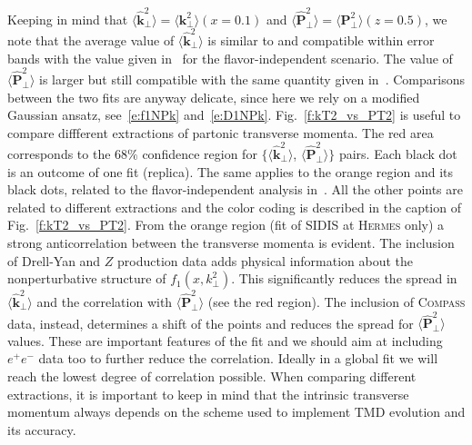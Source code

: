 \documentclass[aps,preprintnumbers,showpacs,nofootinbib,superscriptaddress,floatfix]{revtex4}
\newcommand{\hermes}{\textsc{Hermes }}
\newcommand{\compass}{\textsc{Compass }}
\newcommand{\T}{\perp}
\begin{document}
Keeping in mind that $\big \langle \hat{\bm{k}}_{\T}^2 \big \rangle = \big \langle \bm{k}_{\T}^2 \big \rangle (x=0.1)$ and  $\big \langle \hat{\bm{P}}_{\perp}^2 \big \rangle = \big \langle \bm{P}_{\perp}^2 \big \rangle (z=0.5)$, we note that the average value of $\big \langle \hat{\bm{k}}_{\T}^2 \big \rangle$ is similar to and compatible within error bands with the value given in~\cite{Signori:2013mda} for the flavor-independent scenario. The value of $\big \langle \hat{\bm{P}}_{\perp}^2 \big \rangle$ is larger but still compatible with the same quantity given in~\cite{Signori:2013mda}. Comparisons between the two fits are anyway delicate, since here we rely on a modified Gaussian ansatz, see~\eqref{e:f1NPk} and~\eqref{e:D1NPk}.
Fig.~\ref{f:kT2_vs_PT2} is useful to compare diffferent extractions of partonic transverse momenta. The red area corresponds to the $68\%$ confidence region for $\{ \big \langle \hat{\bm{k}}_{\T}^2 \big \rangle$, $\big \langle \hat{\bm{P}}_{\perp}^2 \big \rangle \}$ pairs. Each black dot is an outcome of one fit (replica). The same applies to the orange region and its black dots, related to the flavor-independent analysis in~\cite{Signori:2013mda}. All the other points are related to different extractions and the color coding is described in the caption of Fig.~\ref{f:kT2_vs_PT2}. 
From the orange region (fit of SIDIS at \hermes only) a strong anticorrelation between the transverse momenta is evident. 
The inclusion of Drell-Yan and $Z$ production data adds physical information about the nonperturbative structure of  $f_1(x,k_\perp^2)$. This significantly reduces the spread in $\big \langle \hat{\bm{k}}_{\T}^2 \big \rangle$ and the correlation with $\big \langle \hat{\bm{P}}_{\perp}^2 \big \rangle$ (see the red region). 
The inclusion of \compass data, instead, determines a shift of the points and reduces the spread for $\big \langle \hat{\bm{P}}_{\perp}^2 \big \rangle$ values. 
These are important features of the fit and we should aim at including $e^+e^-$ data too to further reduce the correlation. Ideally in a global fit we will reach the lowest degree of correlation possible.  
When comparing different extractions, it is important to keep in mind that the intrinsic transverse momentum always depends on the scheme used to implement TMD evolution and its accuracy. 
\end{document}
